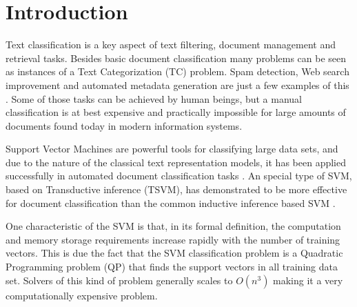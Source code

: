 \section{Introduction}

Text classification is a key aspect of text filtering, document management
and retrieval tasks. Besides basic document classification many problems can be seen as instances of
a Text Categorization (TC) problem. Spam detection, Web search
improvement and automated metadata generation are just a few examples
of this \cite{Sebastiani02}.  Some of those tasks can be achieved
by human beings, but a manual classification is at best expensive
and practically impossible for large amounts of documents found today
in modern information systems.


Support Vector Machines \cite{Vapnik98} are powerful tools for classifying
large data sets, and due to the nature of the classical text representation
models, it has been applied successfully in automated document classification
tasks \cite{Joachims98,Joachims99c}. An special type of SVM, based
on Transductive inference (TSVM), has demonstrated to be more effective
for document classification than the common inductive inference based
SVM \cite{Joachims99c}.

One characteristic of the SVM is that, in its formal definition, the
computation and memory storage requirements increase rapidly with
the number of training vectors. This is due the fact that the SVM
classification problem is a Quadratic Programming problem (QP) that
finds the support vectors in all training data set. Solvers of this
kind of problem generally scales to $O(n^{3})$ making it a very computationally
expensive problem.


